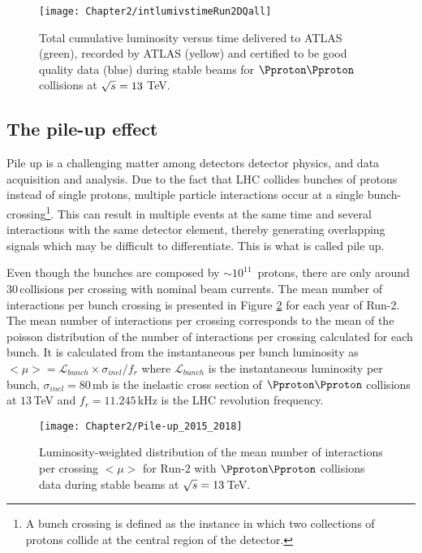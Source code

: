 \begin{figure}
 	 \centering
 	  \texttt{[image: Chapter2/intlumivstimeRun2DQall]}
	  \caption{Total cumulative luminosity versus time delivered to ATLAS (green), recorded by ATLAS (yellow) and certified to be good quality data (blue) during stable beams for $\Pproton\Pproton$ collisions at $\sqrt{s} = 13$ TeV.}
	\label{fig:Chap2:intlumivstimeRun2DQall}
\end{figure}


\subsection{The pile-up effect} 
\label{sec:Chap2:LHC:pileup}


Pile up is a challenging matter among detectors detector physics, and data acquisition and analysis.
Due to the fact that LHC collides bunches of protons instead of single protons, multiple particle interactions
occur at a single bunch-crossing\footnote{A bunch crossing is defined as the instance in which two 
collections of protons collide at the central region of the detector.}. This can result in multiple events
at the same time and several interactions
with the same detector element, thereby generating overlapping signals which may be difficult
to differentiate. This is what is called pile up.

Even though the bunches are composed by $\sim 10^{11}\,$ protons, there are only around 
$30\,$collisions per crossing with nominal beam currents. The mean number of interactions 
per bunch crossing is presented in Figure \ref{fig:Chap2:LHC:PileUp_15-18} for each year of 
Run-2.  The mean number of interactions per crossing 
corresponds to the mean of the poisson distribution of the number of interactions per crossing 
calculated for each bunch. It is calculated from the instantaneous per bunch luminosity as $<\mu> = \mathcal{L}_{bunch} \times \sigma_{inel} / f_{r}$
where $\mathcal{L}_{bunch}$ is the instantaneous luminosity per bunch, $\sigma_{inel} = 80\,$mb is the inelastic cross section of $\Pproton \Pproton$ collisions at $13\,$TeV
and $f_{r}=11.245\,$kHz is the LHC revolution frequency.


\begin{figure}
	\centering
 	 \texttt{[image: Chapter2/Pile-up\_2015\_2018]}
	 \caption{Luminosity-weighted distribution of the mean number of interactions 
	 per crossing $<\mu >$ for Run-2 with $\Pproton \Pproton$ collisions data during stable beams at $\sqrt{s}=13\,$TeV.}
	\label{fig:Chap2:LHC:PileUp_15-18}
\end{figure}

